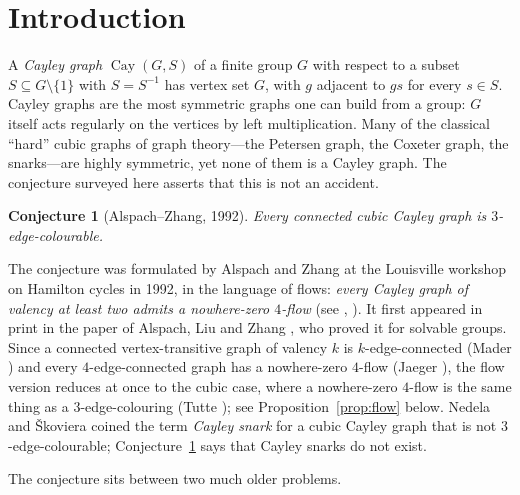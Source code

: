 \documentclass[11pt,a4paper]{article}
\newtheorem{conjecture}[theorem]{Conjecture}
\theoremstyle{definition}
\theoremstyle{remark}
\newcommand{\Cay}{\operatorname{Cay}}
\newcommand{\PSL}{\operatorname{PSL}}
\begin{document}
\begin{abstract}
For $q=2^m\ge4$, we additionally construct colourings on $\PSL(2,q)$ for at least $13/16-O(q^{-1/2})$ of the generating translations $a(z)=z+c$ for every fixed full-cycle generator $x(z)=1/(z+t)$, uniformly in $t$.  This follows from an exact trace criterion for a paired two-chord exchange and a Kloosterman-sum count.  The full conjecture remains open.
\end{abstract}

\tableofcontents

\section{Introduction}

A \emph{Cayley graph} $\Cay(G,S)$ of a finite group $G$ with respect to a subset $S\subseteq G\setminus\{1\}$ with $S=S^{-1}$ has vertex set $G$, with $g$ adjacent to $gs$ for every $s\in S$.  Cayley graphs are the most symmetric graphs one can build from a group: $G$ itself acts regularly on the vertices by left multiplication.  Many of the classical ``hard'' cubic graphs of graph theory---the Petersen graph, the Coxeter graph, the snarks---are highly symmetric, yet none of them is a Cayley graph.  The conjecture surveyed here asserts that this is not an accident.

\begin{conjecture}[Alspach--Zhang, 1992]\label{conj:AZ}
Every connected cubic Cayley graph is $3$-edge-colourable.
\end{conjecture}

The conjecture was formulated by Alspach and Zhang at the Louisville workshop on Hamilton cycles in 1992, in the language of flows: \emph{every Cayley graph of valency at least two admits a nowhere-zero $4$-flow} (see \cite[\S1]{LiZhou16}, \cite[\S1]{ZhangZhou24}).  It first appeared in print in the paper of Alspach, Liu and Zhang \cite{ALZ96}, who proved it for solvable groups.  Since a connected vertex-transitive graph of valency $k$ is $k$-edge-connected (Mader \cite{Mader71}) and every $4$-edge-connected graph has a nowhere-zero $4$-flow (Jaeger \cite{Jaeger79}), the flow version reduces at once to the cubic case, where a nowhere-zero $4$-flow is the same thing as a $3$-edge-colouring (Tutte \cite{Tutte54}); see Proposition~\ref{prop:flow} below.  Nedela and \v{S}koviera \cite{NS01} coined the term \emph{Cayley snark} for a cubic Cayley graph that is not $3$-edge-colourable; Conjecture~\ref{conj:AZ} says that Cayley snarks do not exist.

The conjecture sits between two much older problems.
\end{document}
